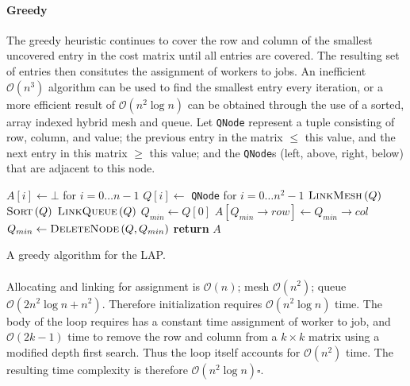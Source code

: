 \documentclass{article}
\newcommand{\boundedBy}[1]{\mathcal{O} \left ( #1 \right )}
\newcommand{\FuncCall}[2]{\textsc{#1} \left ( #2 \right )}
\begin{document}
\paragraph{Greedy}

The greedy heuristic continues to cover the row and column of the smallest uncovered entry in the cost matrix until all entries are covered. The resulting set of entries then consitutes the assignment of workers to jobs. An inefficient $\boundedBy{n^3}$ algorithm can be used to find the smallest entry every iteration, or a more efficient result of $\boundedBy{n^2 \log n}$ can be obtained through the use of a sorted, array indexed hybrid mesh and queue. Let \texttt{QNode} represent a tuple consisting of row, column, and value; the previous entry in the matrix $\le$ this value, and the next entry in this matrix $\ge$ this value; and the \texttt{QNode}s (left, above, right, below) that are adjacent to this node.

\begin{algorithm}
\begin{algorithmic}
 
\State $A[i] \gets \bot$ for $i = 0 \ldots n - 1$ 
\State $Q[i] \gets$ \texttt{QNode} for $i = 0 \ldots n^2 - 1$
\State $\FuncCall{LinkMesh}{Q}$ 
\State $\FuncCall{Sort}{Q}$ 
\State $\FuncCall{LinkQueue}{Q}$ 
\State $Q_{min} \gets Q[0]$
	\State $A[ Q_{min} \rightarrow row ] \gets Q_{min} \rightarrow col$
	\State $Q_{min} \gets \FuncCall{DeleteNode}{Q, Q_{min}}$ 
\EndWhile
\State \textbf{return} $A$
\EndProcedure
\end{algorithmic}
\caption{A greedy algorithm for the LAP.}
\label{alg:greedy}
\end{algorithm}

\paragraph{} Allocating and linking for assignment is $\boundedBy{n}$; mesh $\boundedBy{n^2}$; queue $\boundedBy{2n^2\log n + n^2}$. Therefore initialization requires $\boundedBy{n^2 \log n}$ time. The body of the loop requires has a constant time assignment of worker to job, and $\boundedBy{2k - 1}$ time to remove the row and column from a $k \times k$ matrix using a modified depth first search. Thus the loop itself accounts for $\boundedBy{n^2}$ time. The resulting time complexity is therefore $\boundedBy{n^2 \log n} \square$.
\end{document}
